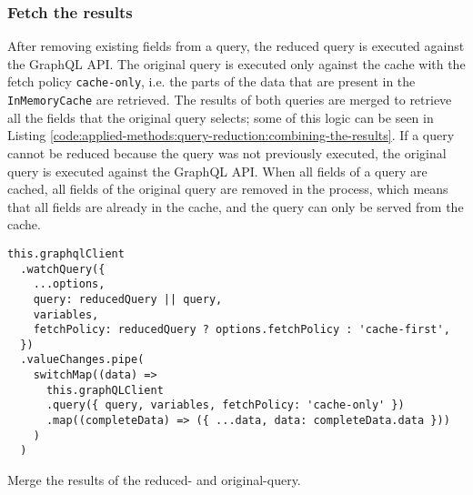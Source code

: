 \subsubsection{Fetch the results}

\noindent After removing existing fields from a query, the reduced query is executed against the GraphQL \ac{API}. The original query is executed only against the cache with the fetch policy \texttt{cache-only}, i.e. the parts of the data that are present in the \texttt{InMemoryCache} are retrieved. The results of both queries are merged to retrieve all the fields that the original query selects; some of this logic can be seen in Listing \ref{code:applied-methods:query-reduction:combining-the-results}. If a query cannot be reduced because the query was not previously executed, the original query is executed against the GraphQL \ac{API}. When all fields of a query are cached, all fields of the original query are removed in the process, which means that all fields are already in the cache, and the query can only be served from the cache.

\ifshowListings
\begin{listing}[H]
\begin{verbatim}
this.graphqlClient
  .watchQuery({
    ...options,
    query: reducedQuery || query,
    variables,
    fetchPolicy: reducedQuery ? options.fetchPolicy : 'cache-first',
  })
  .valueChanges.pipe(
    switchMap((data) =>
      this.graphQLClient
      .query({ query, variables, fetchPolicy: 'cache-only' })
      .map((completeData) => ({ ...data, data: completeData.data }))
    )
  )
\end{verbatim}
\caption{Merge the results of the reduced- and original-query.}\label{code:applied-methods:query-reduction:combining-the-results}
\end{listing}
\fi
